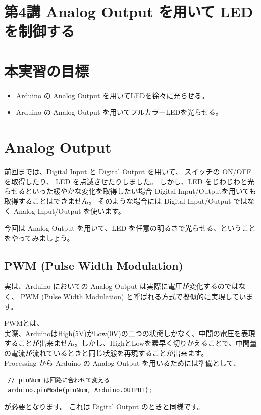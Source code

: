 \documentclass[11pt,a4paper]{jarticle}
\begin{document}
\section*{\LARGE{第4講 Analog Output を用いて LED を制御する}}
\section{本実習の目標}
\begin{itemize}
 \item Arduino の Analog Output を用いてLEDを徐々に光らせる。
 \item Arduino の Analog Output を用いてフルカラーLEDを光らせる。
\end{itemize}

\section{Analog Output}
前回までは、Digital Input と Digital Output を用いて、
スイッチの ON/OFF を取得したり、 LED を点滅させたりしました。
しかし、LED をじわじわと光らせるといった緩やかな変化を取得したい場合
Digital Input/Outputを用いても取得することはできません。
そのような場合には Digital Input/Output ではなく Analog Input/Output を使います。

今回は Analog Output を用いて、LED を任意の明るさで光らせる、ということをやってみましょう。

\subsection*{PWM (Pulse Width Modulation)}
実は、Arduino においての Analog Output は実際に電圧が変化するのではなく、
PWM (Pulse Width Modulation) と呼ばれる方式で擬似的に実現しています。

PWMとは、\\
実際、ArduinoはHigh(5V)かLow(0V)の二つの状態しかなく、中間の電圧を表現することが出来ません。しかし、HighとLowを素早く切りかえることで、中間量の電流が流れているときと同じ状態を再現することが出来ます。
\\

Processing から Arduino の Analog Output を用いるためには準備として、
\begin{lstlisting}
 // pinNum は回路に合わせて変える 
 arduino.pinMode(pinNum, Arduino.OUTPUT);
\end{lstlisting}
が必要となります。
これは Digital Output のときと同様です。
\end{document}
